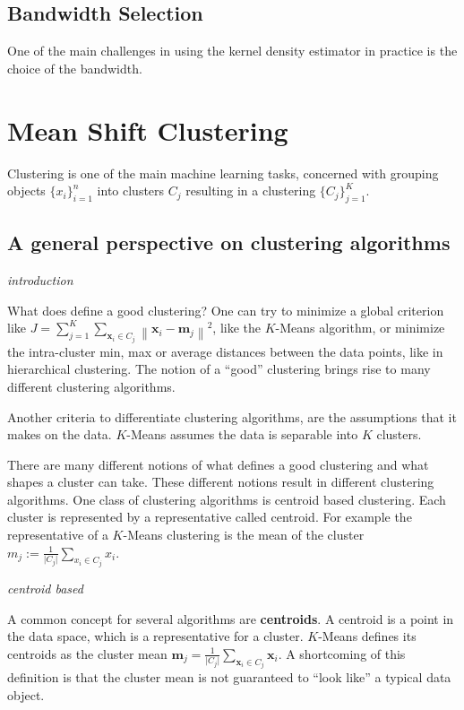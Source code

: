 \documentclass{article}
\newcommand{\norm}[1]{\left\lVert#1\right\rVert}
\begin{document}
\subsection{Bandwidth Selection}

One of the main challenges in using the kernel density estimator in practice is the choice of the bandwidth.


\section{Mean Shift Clustering}

Clustering is one of the main machine learning tasks, concerned with grouping objects $\{x_i\}_{i=1}^n$ into clusters $C_j$ resulting in a clustering $\{ C_j \}_{j=1}^K$.

\subsection{A general perspective on clustering algorithms}

\textit{introduction}

What does define a good clustering? One can try to minimize a global criterion like $J = \sum_{j=1}^K \sum_{\bm{x}_i \in C_j} \norm{\bm{x}_i - \bm{m}_j}^2$, like the $K$-Means algorithm, or minimize the intra-cluster min, max or average distances between the data points, like in hierarchical clustering. The notion of a ``good'' clustering brings rise to many different clustering algorithms.

Another criteria to differentiate clustering algorithms, are the assumptions that it makes on the data. $K$-Means assumes the data is separable into $K$ clusters. 

There are many different notions of what defines a good clustering and what shapes a cluster can take. These different notions result in different clustering algorithms. One class of clustering algorithms is centroid based clustering. Each cluster is represented by a representative called centroid. For example the representative of a $K$-Means clustering is the mean of the cluster $m_j := \frac{1}{\lvert C_j \rvert} \sum_{x_i \in C_j} x_i$.

\textit{centroid based}

A common concept for several algorithms are \textbf{centroids}. A centroid is a point in the data space, which is a representative for a cluster. $K$-Means defines its centroids as the cluster mean $\bm{m}_j = \frac{1}{\lvert C_j \rvert} \sum_{\bm{x}_i \in C_j} \bm{x}_i$. A shortcoming of this definition is that the cluster mean is not guaranteed to ``look like'' a typical data object.
\end{document}

